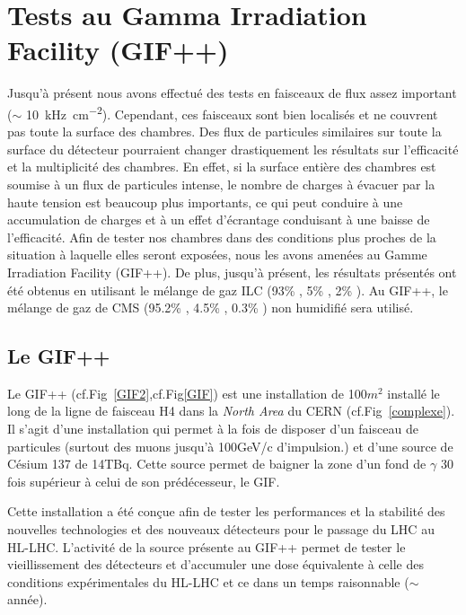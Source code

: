 \section {Tests au Gamma Irradiation Facility (GIF++)}
Jusqu'à présent nous avons effectué des tests en faisceaux de flux assez important ($\sim$ \SI{10}{\kilo\hertz\per\square\centi\meter}). Cependant, ces faisceaux sont bien localisés et ne couvrent pas toute la surface des chambres. Des flux de particules similaires sur toute la surface du détecteur pourraient changer drastiquement les résultats sur l'efficacité et la multiplicité des chambres. En effet, si la surface entière des chambres est soumise à un flux de particules intense, le nombre de charges à évacuer par la haute tension est beaucoup plus importants, ce qui peut conduire à une accumulation de charges et à un effet d'écrantage conduisant à une baisse de l'efficacité. Afin de tester nos chambres dans des conditions plus proches de la situation à laquelle elles seront exposées, nous les avons amenées au Gamme Irradiation Facility (GIF++). De plus, jusqu'à présent, les résultats présentés ont été obtenus en utilisant le mélange de gaz ILC (93\% , 5\% , 2\% ). Au GIF++, le mélange de gaz de CMS (95.2\% , 4.5\% , 0.3\% ) non humidifié sera utilisé.

\subsection{Le GIF++}
Le GIF++ \cite{Jakel:1977147} (cf.Fig~\ref{GIF2},cf.Fig\ref{GIF}) est une installation de 100$m^2$ installé le long de la ligne de faisceau H4 dans la \textit{North Area} du CERN (cf.Fig~\ref{complexe}). Il s'agit d'une installation qui permet à la fois de disposer d'un faisceau de particules (surtout des muons jusqu'à 100GeV/c d'impulsion.) et d'une source de Césium 137 de 14TBq. Cette source permet de baigner la zone d'un fond de $\gamma$ 30 fois supérieur à celui de son prédécesseur, le GIF.

Cette installation a été conçue afin de tester les performances et la stabilité des nouvelles technologies et des nouveaux détecteurs pour le passage du LHC au HL-LHC. L'activité de la source présente au GIF++ permet de tester le vieillissement des détecteurs et d'accumuler une dose équivalente à celle des conditions expérimentales du HL-LHC et ce dans un temps raisonnable ($\sim$ année). 

